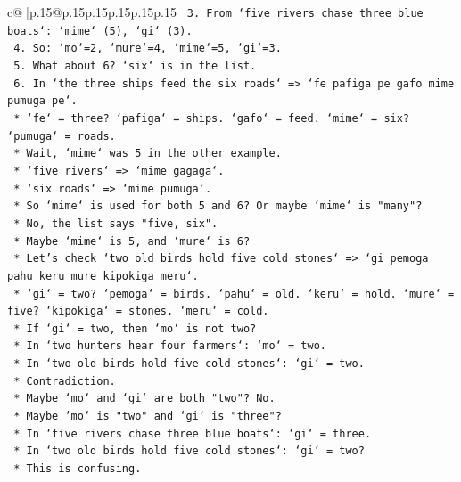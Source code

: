 \documentclass{article}
\begin{document}
{\begin{supertabular}{c@{$\;$}|p{.15\linewidth}@{}p{.15\linewidth}p{.15\linewidth}p{.15\linewidth}p{.15\linewidth}p{.15\linewidth}}
{{{\texttt{            3.  From `five rivers chase three blue boats`: `mime` (5), `gi` (3).} \\
\texttt{            4.  So: `mo`=2, `mure`=4, `mime`=5, `gi`=3.} \\
\texttt{            5.  What about 6? `six` is in the list.} \\
\texttt{            6.  In `the three ships feed the six roads` => `fe pafiga pe gafo mime pumuga pe`.} \\
\texttt{                *   `fe` = three? `pafiga` = ships. `gafo` = feed. `mime` = six? `pumuga` = roads.} \\
\texttt{                *   Wait, `mime` was 5 in the other example.} \\
\texttt{                *   `five rivers` => `mime gagaga`.} \\
\texttt{                *   `six roads` => `mime pumuga`.} \\
\texttt{                *   So `mime` is used for both 5 and 6? Or maybe `mime` is "many"?} \\
\texttt{                *   No, the list says "five, six".} \\
\texttt{                *   Maybe `mime` is 5, and `mure` is 6?} \\
\texttt{                *   Let's check `two old birds hold five cold stones` => `gi pemoga pahu keru mure kipokiga meru`.} \\
\texttt{                *   `gi` = two? `pemoga` = birds. `pahu` = old. `keru` = hold. `mure` = five? `kipokiga` = stones. `meru` = cold.} \\
\texttt{                *   If `gi` = two, then `mo` is not two?} \\
\texttt{                *   In `two hunters hear four farmers`: `mo` = two.} \\
\texttt{                *   In `two old birds hold five cold stones`: `gi` = two.} \\
\texttt{                *   Contradiction.} \\
\texttt{                *   Maybe `mo` and `gi` are both "two"? No.} \\
\texttt{                *   Maybe `mo` is "two" and `gi` is "three"?} \\
\texttt{                *   In `five rivers chase three blue boats`: `gi` = three.} \\
\texttt{                *   In `two old birds hold five cold stones`: `gi` = two?} \\
\texttt{                *   This is confusing.} \\
}}}
\end{supertabular}}
\end{document}
